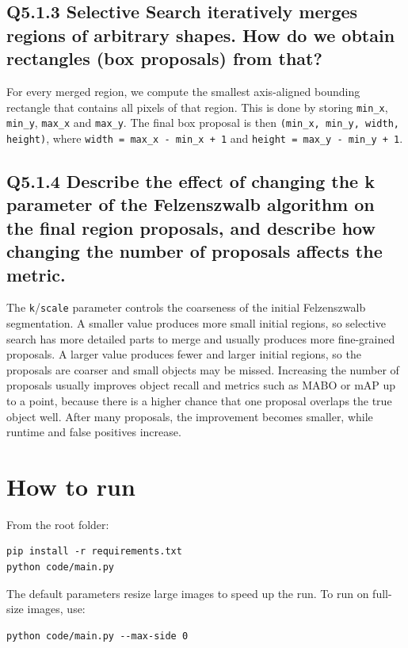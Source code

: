 \documentclass[11pt,a4paper]{article}
\begin{document}
\subsection*{Q5.1.3 Selective Search iteratively merges regions of arbitrary shapes. How do we obtain rectangles (box proposals) from that?}
For every merged region, we compute the smallest axis-aligned bounding rectangle that contains all pixels of that region. This is done by storing \texttt{min\_x}, \texttt{min\_y}, \texttt{max\_x} and \texttt{max\_y}. The final box proposal is then \texttt{(min\_x, min\_y, width, height)}, where \texttt{width = max\_x - min\_x + 1} and \texttt{height = max\_y - min\_y + 1}.

\subsection*{Q5.1.4 Describe the effect of changing the k parameter of the Felzenszwalb algorithm on the final region proposals, and describe how changing the number of proposals affects the metric.}
The \texttt{k}/\texttt{scale} parameter controls the coarseness of the initial Felzenszwalb segmentation. A smaller value produces more small initial regions, so selective search has more detailed parts to merge and usually produces more fine-grained proposals. A larger value produces fewer and larger initial regions, so the proposals are coarser and small objects may be missed. Increasing the number of proposals usually improves object recall and metrics such as MABO or mAP up to a point, because there is a higher chance that one proposal overlaps the true object well. After many proposals, the improvement becomes smaller, while runtime and false positives increase.

\section*{How to run}
From the root folder:
\begin{verbatim}
pip install -r requirements.txt
python code/main.py
\end{verbatim}
The default parameters resize large images to speed up the run. To run on full-size images, use:
\begin{verbatim}
python code/main.py --max-side 0
\end{verbatim}
\end{document}
